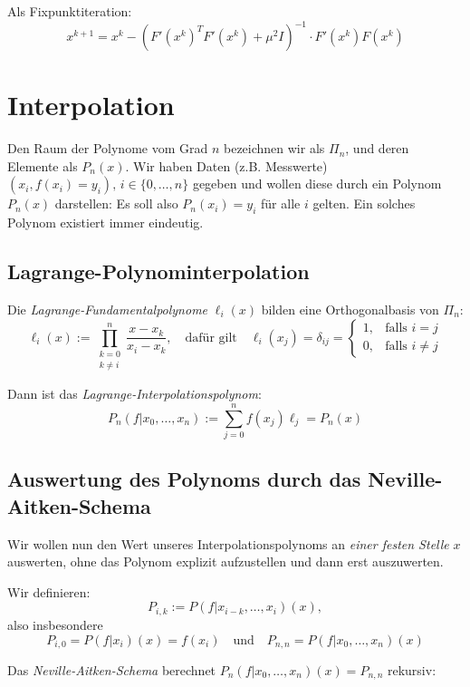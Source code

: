 \documentclass{panikzettel}
\begin{document}
Als Fixpunktiteration:
\[ x^{k+1} = x^k - (F'(x^k)^T F'(x^k) + \mu^2 I)^{-1} \cdot F'(x^k) F(x^k) \]

\section{Interpolation}
Den Raum der Polynome vom Grad $n$ bezeichnen wir als $\Pi_n$, und deren Elemente als $P_n (x)$. Wir haben Daten (z.B. Messwerte) $(x_i,f(x_i) = y_i),\, i \in \{0,\ldots,n\}$ gegeben und wollen diese durch ein Polynom $P_n(x)$ darstellen: Es soll also $P_n(x_i) = y_i$ für alle $i$ gelten. Ein solches Polynom existiert immer eindeutig.

\subsection{Lagrange-Polynominterpolation}
Die \emph{Lagrange-Fundamentalpolynome} $\ell_i(x)$ bilden eine Orthogonalbasis von $\Pi_n$:
\[
  \ell_i(x) := \prod_{\substack{k = 0 \\ k \neq i}}^n \frac{x - x_k}{x_i - x_k},
  \quad\text{dafür gilt}\quad
  \ell_i(x_j) = \delta_{ij} = \begin{cases}
    1, &\text{falls } i = j \\
    0, &\text{falls } i \neq j
  \end{cases}
\]

Dann ist das \emph{Lagrange-Interpolationspolynom}:
\[ P_n(f|x_0,\ldots, x_n) := \sum_{j=0}^n f (x_j) \ell_j = P_n(x) \]

\subsection{Auswertung des Polynoms durch das Neville-Aitken-Schema}
Wir wollen nun den Wert unseres Interpolationspolynoms an \emph{einer festen Stelle} $x$ auswerten, ohne das Polynom explizit aufzustellen und dann erst auszuwerten.

Wir definieren:
\[ P_{i,k} := P(f|x_{i-k},\ldots,x_i)(x), \]
also insbesondere
\[ P_{i,0} = P(f|x_i)(x) = f(x_i) \quad\text{und}\quad P_{n,n} = P(f|x_0,\ldots,x_n)(x) \]

Das \emph{Neville-Aitken-Schema} berechnet $P_n(f|x_0,\ldots, x_n)(x) = P_{n,n}$ rekursiv:
\end{document}

